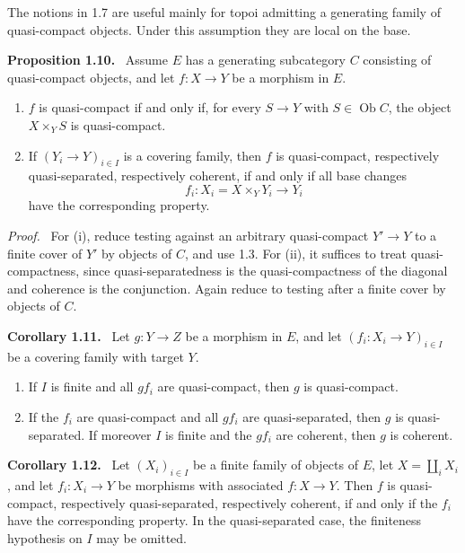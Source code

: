 \documentclass[11pt]{article}
\newcommand{\Ob}{\operatorname{Ob}}
\newcommand{\fprod}[3]{{#1}\times_{#3}{#2}}
\newenvironment{statement}[1]{\par\medskip\noindent\textbf{#1.}\ }{\par\medskip}
\newenvironment{prooftext}{\par\noindent\emph{Proof.}\ }{\par\medskip}
\begin{document}
The notions in 1.7 are useful mainly for topoi admitting a generating family of quasi-compact objects. Under this assumption they are local on the base.

\begin{statement}{Proposition 1.10}
Assume \(E\) has a generating subcategory \(C\) consisting of quasi-compact objects, and let \(f:X\to Y\) be a morphism in \(E\).
\begin{enumerate}[label=(\roman*)]
\item \(f\) is quasi-compact if and only if, for every \(S\to Y\) with \(S\in\Ob C\), the object \(\fprod{X}{S}{Y}\) is quasi-compact.
\item If \((Y_i\to Y)_{i\in I}\) is a covering family, then \(f\) is quasi-compact, respectively quasi-separated, respectively coherent, if and only if all base changes
\[
f_i:X_i=\fprod{X}{Y_i}{Y}\longrightarrow Y_i
\]
have the corresponding property.
\end{enumerate}
\end{statement}

\begin{prooftext}
For (i), reduce testing against an arbitrary quasi-compact \(Y'\to Y\) to a finite cover of \(Y'\) by objects of \(C\), and use 1.3. For (ii), it suffices to treat quasi-compactness, since quasi-separatedness is the quasi-compactness of the diagonal and coherence is the conjunction. Again reduce to testing after a finite cover by objects of \(C\).
\end{prooftext}

\begin{statement}{Corollary 1.11}
Let \(g:Y\to Z\) be a morphism in \(E\), and let \((f_i:X_i\to Y)_{i\in I}\) be a covering family with target \(Y\).
\begin{enumerate}[label=(\roman*)]
\item If \(I\) is finite and all \(gf_i\) are quasi-compact, then \(g\) is quasi-compact.
\item If the \(f_i\) are quasi-compact and all \(gf_i\) are quasi-separated, then \(g\) is quasi-separated. If moreover \(I\) is finite and the \(gf_i\) are coherent, then \(g\) is coherent.
\end{enumerate}
\end{statement}

\begin{statement}{Corollary 1.12}
Let \((X_i)_{i\in I}\) be a finite family of objects of \(E\), let \(X=\coprod_iX_i\), and let \(f_i:X_i\to Y\) be morphisms with associated \(f:X\to Y\). Then \(f\) is quasi-compact, respectively quasi-separated, respectively coherent, if and only if the \(f_i\) have the corresponding property. In the quasi-separated case, the finiteness hypothesis on \(I\) may be omitted.
\end{statement}
\end{document}
